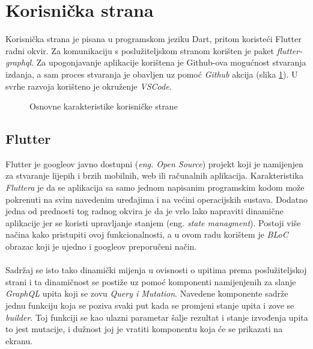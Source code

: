 \documentclass[times, utf8, zavrsni]{fer}
\begin{document}
\section{Korisnička strana}
Korisnička strana je pisana u programskom jeziku Dart, pritom koristeći
Flutter radni okvir.
Za komunikaciju s poslužiteljskom stranom korišten je paket \textit{flutter-graphql}.
Za upogonjavanje aplikacije korištena je Github-ova mogućnost
stvaranja izdanja, a sam proces stvaranja je obavljen uz pomoć \textit{Github} akcija (slika \ref{fig:Frontend}).
U svrhe razvoja korišteno je okruženje \textit{VSCode}.
\begin{figure}[h]
      \centering
      \caption{Osnovne karakteristike korisničke strane}
      \label{fig:Frontend}
\end{figure}

\subsection{Flutter}
Flutter je googleov javno dostupni (\textit{eng. Open Source}) projekt koji je namijenjen
za stvaranje lijepih i brzih mobilnih, web ili računalnih aplikacija. Karakteristika
\textit{Fluttera} je da se aplikacija sa samo jednom napisanim programskim kodom može pokrenuti na
svim navedenim uređajima i na većini operacijskih sustava. Dodatno jedna od prednosti tog radnog okvira je da je vrlo lako napraviti
dinamične aplikacije jer se koristi upravljanje stanjem (eng. \textit{state managment}). Postoji više načina
kako pristupiti ovoj funkcionalnosti, a u ovom radu korištem je \textit{BLoC} obrazac koji je ujedno
i googleov preporučeni način.
\\\\
Sadržaj se isto tako dinamički mijenja u ovisnosti o upitima prema poslužiteljskoj strani i ta dinamičnost
se postiže uz pomoć komponenti namijenjenih za slanje \textit{GraphQL} upita koji se zovu \textit{Query i Mutation}.
Navedene komponente sadrže jednu funkciju koja se poziva svaki put kada se promjeni stanje upita i
zove se \textit{builder}. Toj funkciji se kao ulazni parametar šalje rezultat i stanje izvođenja upita to jest mutacije,
i dužnost joj je vratiti komponentu koja će se prikazati na ekranu.
\end{document}
